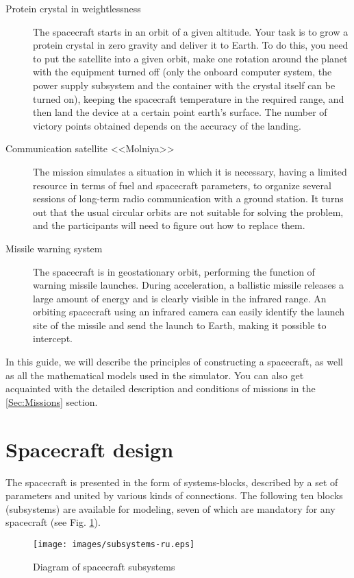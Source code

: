 \documentclass[12pt,a4paper]{article}
\begin{document}
\begin{description}
   \item[Protein crystal in weightlessness] The spacecraft starts in an orbit of a given altitude. Your task is to grow a protein crystal in zero gravity and deliver it to Earth. To do this, you need to put the satellite into a given orbit, make one rotation around the planet with the equipment turned off (only the onboard computer system, the power supply subsystem and the container with the crystal itself can be turned on), keeping the spacecraft temperature in the required range, and then land the device at a certain point earth's surface. The number of victory points obtained depends on the accuracy of the landing.
   \item[Communication satellite <<Molniya>>] The mission simulates a situation in which it is necessary, having a limited resource in terms of fuel and spacecraft parameters, to organize several sessions of long-term radio communication with a ground station. It turns out that the usual circular orbits are not suitable for solving the problem, and the participants will need to figure out how to replace them.
   \item[Missile warning system] The spacecraft is in geostationary orbit, performing the function of warning missile launches. During acceleration, a ballistic missile releases a large amount of energy and is clearly visible in the infrared range. An orbiting spacecraft using an infrared camera can easily identify the launch site of the missile and send the launch to Earth, making it possible to intercept.
\end{description}

In this guide, we will describe the principles of constructing a spacecraft, as well as all the mathematical models used in the simulator. You can also get acquainted with the detailed description and conditions of missions in the \ref{Sec:Missions} section.

\section{Spacecraft design}

The spacecraft is presented in the form of systems-blocks, described by a set of parameters and united by various kinds of connections. The following ten blocks (subsystems) are available for modeling, seven of which are mandatory for any spacecraft (see Fig. \ref{Pic:subsystems}).

\begin{figure}[tbh]
  \begin{center}
    \texttt{[image: images/subsystems-ru.eps]}
    \caption{Diagram of spacecraft subsystems}
    \label{Pic:subsystems}
  \end{center}
\end{figure}
\end{document}
